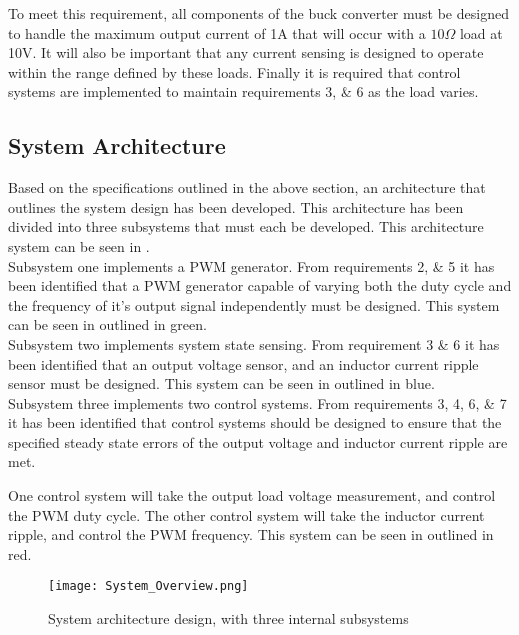To meet this requirement, all components of the buck converter must be designed to handle the maximum output current of 1A that will occur with a $10\Omega$ load at 10V. It will also be important that any current sensing is designed to operate within the range defined by these loads. Finally it is required that control systems are implemented to maintain requirements 3, \& 6 as the load varies. 

\subsection{System Architecture}\label{S:system_architecture}

Based on the specifications outlined in the above section, an architecture that outlines the system design has been developed. This architecture has been divided into three subsystems that must each be developed. This architecture system can be seen in .\\

Subsystem one implements a PWM generator. From requirements 2, \& 5 it has been identified that a PWM generator capable of varying both the duty cycle and the frequency of it's output signal independently must be designed. This system can be seen in  outlined in green.\\

Subsystem two implements system state sensing. From requirement 3 \& 6 it has been identified that an output voltage sensor, and an inductor current ripple sensor must be designed. This system can be seen in  outlined in blue.\\

Subsystem three implements two control systems. From requirements 3, 4, 6, \& 7 it has been identified that control systems should be designed to ensure that the specified steady state errors of the output voltage and inductor current ripple are met. 

One control system will take the output load voltage measurement, and control the PWM duty cycle. The other control system will take the inductor current ripple, and control the PWM frequency. This system can be seen in  outlined in red.

\newpage

\begin{figure}[!h]
    \texttt{[image: System\_Overview.png]}
    \caption{System architecture design, with three internal subsystems}
    \label{F:sys_overview}
\end{figure}


